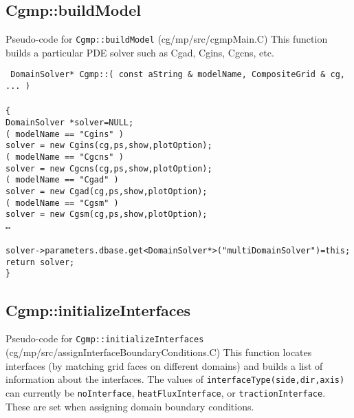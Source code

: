 \subsection{Cgmp::buildModel}
Pseudo-code for {\tt Cgmp::buildModel} (cg/mp/src/cgmpMain.C)
This function builds a particular PDE solver such as Cgad, Cgins, Cgcns, etc.

\begin{flushleft}\tt\small
DomainSolver* Cgmp::( const aString \& modelName, CompositeGrid \& cg, ... ) \\
\\
\{  \\
\ia  DomainSolver *solver=NULL; \\ 
\ia  \IF( modelName == "Cgins" )  \\
\ib    solver = new Cgins(cg,ps,show,plotOption); \\
\ia  \ELSEIF(  modelName == "Cgcns" )  \\
\ib    solver = new Cgcns(cg,ps,show,plotOption); \\
\ia  \ELSEIF(  modelName == "Cgad" )  \\
\ib    solver = new Cgad(cg,ps,show,plotOption); \\
\ia  \ELSEIF(  modelName == "Cgsm" )  \\
\ib    solver = new Cgsm(cg,ps,show,plotOption); \\
\ia  \ldots \\
\ia  \END \\
\ia  solver->parameters.dbase.get<DomainSolver*>("multiDomainSolver")=this; \\
\ia  return solver; \\
\}
\end{flushleft}




\subsection{Cgmp::initializeInterfaces}
Pseudo-code for {\tt Cgmp::initializeInterfaces} (cg/mp/src/assignInterfaceBoundaryConditions.C)
This function locates interfaces (by matching grid faces on different domains) and builds a list 
of information about the interfaces. The values of {\tt interfaceType(side,dir,axis)} can currently 
be {\tt noInterface}, {\tt heatFluxInterface}, or {\tt tractionInterface}. These are set when
assigning domain boundary conditions.

